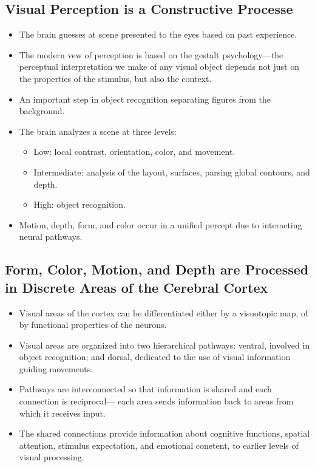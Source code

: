 \documentclass[12pt,a4paper]{article}
\begin{document}
\subsection{Visual Perception is a Constructive Processe}
\begin{itemize}
    \item The brain guesses at scene presented to the eyes based on past experience.
    \item The modern vew of perception is based on the gestalt psychology---the perceptual interpretation we make of any visual object depends not just on the properties of the stimulus, but also the context.
    \item An important step in object recognition separating figures from the background.
    \item The brain analyzes a scene at three levels:
        \begin{itemize}
            \item Low: local contrast, orientation, color, and movement.
            \item Intermediate: analysis of the layout, surfaces, parsing global contours, and depth.
            \item High: object recognition.
        \end{itemize}
    \item Motion, depth, form, and color occur in a unified percept due to interacting neural pathways.
\end{itemize}

\subsection{Form, Color, Motion, and Depth are Processed in Discrete Areas of the Cerebral Cortex}
\begin{itemize}
    \item Visual areas of the cortex can be differentiated either by a visuotopic map, of by functional properties of the neurons.
    \item Visual areas are organized into two hierarchical pathways: ventral, involved in object recognition; and dorsal, dedicated to the use of visual information guiding movements.
    \item Pathways are interconnected so that information is shared and each connection is reciprocal--- each area sends information back to areas from which it receives input.
    \item The shared connections provide information about cognitive functions, spatial attention, stimulus expectation, and emotional conetent, to earlier levels of visual processing.
\end{itemize}
\end{document}
